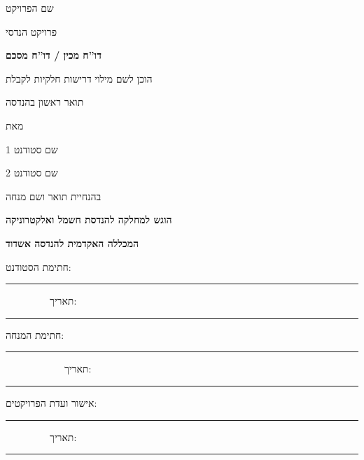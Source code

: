 \documentclass[12pt]{book}
\numberwithin{equation}{section}
\numberwithin{figure}{section}
\numberwithin{table}{section}
\begin{document}
\begin{hebrew}
\begin{center}
{\Large שם הפרויקט}
\vspace*{0.5cm}

{\Large פרויקט הנדסי}

\vspace*{1cm}

\fontsize{14pt}{17pt}
\selectfont

\textbf{דו''ח מכין / דו''ח מסכם}
\vspace*{1.5cm}

\fontsize{10pt}{12pt}
\selectfont

הוכן לשם מילוי דרישות חלקיות לקבלת

תואר ראשון בהנדסה 

\vspace*{1cm}

מאת

\vspace*{1cm}

\fontsize{16pt}{19pt}
\selectfont

{\Large שם סטודנט 1}

\vspace*{0.5cm}

{\Large שם סטודנט 2}

\fontsize{12pt}{12pt}
\selectfont

\vspace*{1cm}

בהנחיית תואר ושם מנחה

\vspace*{2cm}

\fontsize{14pt}{17pt}
\selectfont

\textbf{הוגש למחלקה להנדסת חשמל ואלקטרוניקה}
  
\textbf{המכללה האקדמית להנדסה אשדוד}

\vspace*{3cm}
\end{center}

\fontsize{10pt}{12pt}
\selectfont

חתימת הסטודנט: \rule{3cm}{1pt} ~~~~~~~~~תאריך: \rule{3cm}{1pt}

\vspace*{0.5cm}

חתימת המנחה: \rule{3cm}{1pt} ~~~~~~~~~~~~תאריך: \rule{3cm}{1pt}

\vspace*{0.5cm}

אישור ועדת הפרויקטים: \rule{2cm}{1pt} ~~~~~~~~~תאריך: \rule{3cm}{1pt}




\newpage
\doublespacing



\end{hebrew}
\end{document}
